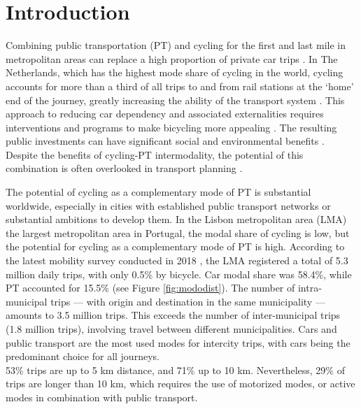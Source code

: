 \documentclass[review, doubleblind, 3p,
authoryear]{elsarticle} %
\begin{document}
\section{Introduction}\label{introduction}

Combining public transportation (PT) and cycling for the first and last
mile in metropolitan areas can replace a high proportion of private car
trips \citep{MARTENS2007326}. In The Netherlands, which has the highest
mode share of cycling in the world, cycling accounts for more than a
third of all trips to and from rail stations at the `home' end of the
journey, greatly increasing the ability of the transport system
\citep{RIETVELD200071}. This approach to reducing car dependency and
associated externalities requires interventions and programs to make
bicycling more appealing \citep{lapaix_role_2021}. The resulting public
investments can have significant social and environmental benefits
\citep{internationaltransportforum_integrating_2017}. Despite the
benefits of cycling-PT intermodality, the potential of this combination
is often overlooked in transport planning \citep{lapaix_role_2021}.

The potential of cycling as a complementary mode of PT is substantial
worldwide, especially in cities with established public transport
networks or substantial ambitions to develop them. In the Lisbon
metropolitan area (LMA) the largest metropolitan area in Portugal, the
modal share of cycling is low, but the potential for cycling as a
complementary mode of PT is high. According to the latest mobility
survey conducted in 2018 \citep{IMOB}, the LMA registered a total of 5.3
million daily trips, with only 0.5\% by bicycle. Car modal share was
58.4\%, while PT accounted for 15.5\% (see Figure \ref{fig:mododist}).
The number of intra-municipal trips --- with origin and destination in
the same municipality --- amounts to 3.5 million trips. This exceeds the
number of inter-municipal trips (1.8 million trips), involving travel
between different municipalities. Cars and public transport are the most
used modes for intercity trips, with cars being the predominant choice
for all journeys.\\
53\% trips are up to 5 km distance, and 71\% up to 10 km. Nevertheless,
29\% of trips are longer than 10 km, which requires the use of motorized
modes, or active modes in combination with public transport.
\end{document}
